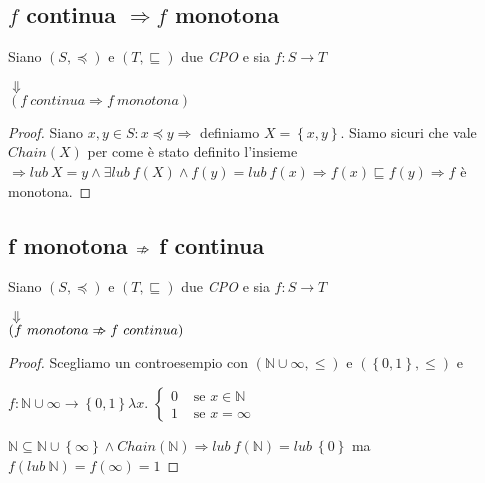 \documentclass[a4paper, 10pt]{article} %
\begin{document}
\subsection{$f$  continua $\Rightarrow f$  monotona}
\begin{esercizio}
  Siano $(S, \preceq)$ e $(T, \sqsubseteq)$ due \emph{CPO} e sia $f: S \rightarrow T $
  \begin{center}
    $\Downarrow$\\
    $(f\ continua \Rightarrow f\ monotona)$
  \end{center}    
  \begin{proof}
    Siano $x,y \in S : x \preceq y \Rightarrow $ definiamo $X = \left\{x,y\right\}$. Siamo sicuri che vale $Chain(X)$ per come è stato definito l'insieme $\Rightarrow lub\ X = y \land \exists lub\ f(X) \land f(y) = lub\ f(x) \Rightarrow f(x) \sqsubseteq f(y) \Rightarrow f$ è monotona.
  \end{proof}
\end{esercizio}


\subsection{f monotona $\Arrownot \Rightarrow$ f continua}
\begin{esercizio}
  Siano $(S, \preceq)$ e $(T, \sqsubseteq)$ due \emph{CPO} e sia $f: S \rightarrow T$
  \begin{center}
    $\Downarrow$\\
    $(f\ monotona \Arrownot \Rightarrow f\ continua)$
  \end{center}
  \begin{proof}
    Scegliamo un controesempio con $(\mathbb{N} \cup \infty, \leq)$ e $(\left\{0,1\right\},\leq)$ e
    \begin{center}
      $f: \mathbb{N} \cup \infty \rightarrow \left\{0,1\right\} \lambda x.$
      $\begin{cases}
        0 & \text{ se } x \in \mathbb{N}
        \\
        1 & \text{ se } x = \infty
      \end{cases}
      $
    \end{center}
    $\mathbb{N} \subseteq \mathbb{N} \cup \left\{\infty\right\} \land Chain(\mathbb{N}) \Rightarrow lub\ f(\mathbb{N}) = lub\ \left\{0\right\}$ ma $f(lub\ \mathbb{N}) = f(\infty) = 1$
  \end{proof}
\end{esercizio}
\end{document}

